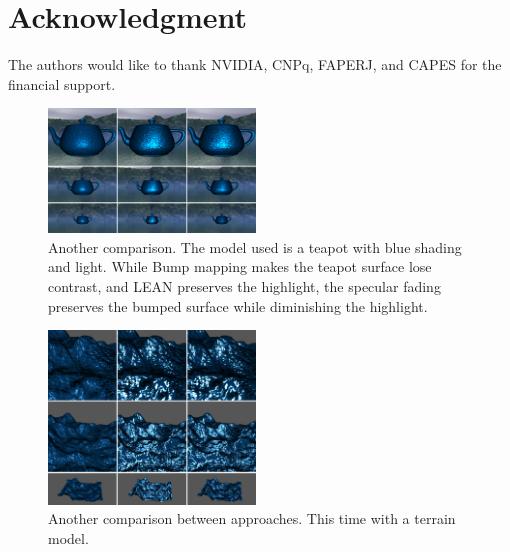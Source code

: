 \documentclass[10pt, conference]{IEEEtran}
\begin{document}
\iffinal
\section*{Acknowledgment}
%
The authors would like to thank NVIDIA, CNPq, FAPERJ, and CAPES for the financial support.
\fi







%
%




\begin{figure}[h]
	\includegraphics[width=0.49\textwidth]{figs/teapot1.png}
	\caption{Another comparison. The model used is a teapot with blue shading and light. While Bump mapping makes the teapot surface lose contrast, and LEAN preserves the highlight, the specular fading preserves the bumped surface while diminishing the highlight.}
	\label{fig:teapot1}
\end{figure}

\begin{figure}[h]
	\includegraphics[width=0.49\textwidth]{figs/terrain1.png}
	\caption{Another comparison between approaches. This time with a terrain model.}
	\label{fig:terrain1}
\end{figure}
\end{document}
